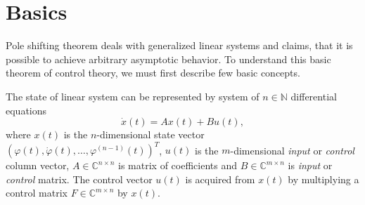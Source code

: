 \documentclass[a4paper,11pt]{article}
\newcommand{\N}{\mathbb{N}}   %
\newcommand{\C}{\mathbb{C}}
\begin{document}
\section{Basics}

Pole shifting theorem deals with generalized linear systems and claims, that it is possible to achieve arbitrary asymptotic behavior. To understand this basic theorem of control theory, we must first describe few basic concepts.

The state of linear system can be represented by system of $n\in \N$ differential equations $$\dot{x}(t)=Ax(t)+Bu(t),$$ where $x(t)$ is the $n$-dimensional state vector $(\varphi(t),\dot{\varphi}(t),\dots,\varphi^{(n-1)}(t))^T$, $u(t)$ is the $m$-dimensional \textit{input} or \textit{control} column vector, $A \in \C ^{n\times n}$ is matrix of coefficients and $B\in \C ^{m\times n}$ is \textit{input} or \textit{control} matrix. The control vector $u(t)$ is acquired from $x(t)$ by multiplying a control matrix $F\in \C ^{m\times n}$ by $x(t)$. 
\end{document}
